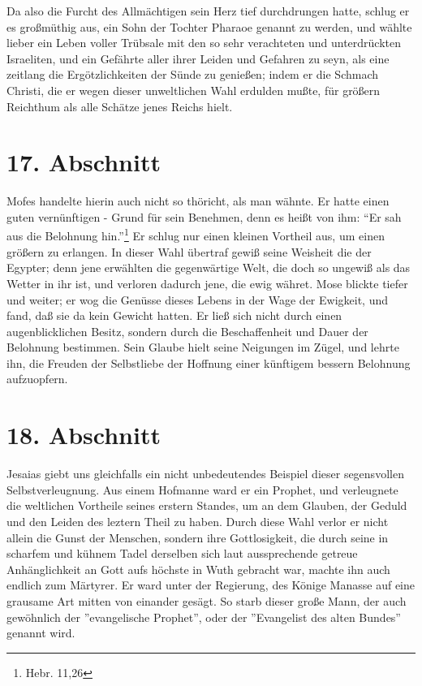 Da also die Furcht des Allmächtigen sein Herz tief durchdrungen hatte, schlug er
es großmüthig aus, ein Sohn der Tochter Pharaoe genannt zu werden, und wählte
lieber ein Leben voller Trübsale mit den so sehr verachteten und unterdrückten
Israeliten, und ein Gefährte aller ihrer Leiden und Gefahren zu seyn, als eine
zeitlang die Ergötzlichkeiten der Sünde zu genießen; indem er die Schmach
Christi, die er wegen dieser unweltlichen Wahl erdulden mußte, für größern
Reichthum als alle Schätze jenes Reichs hielt.

\section{17. Abschnitt} \label{kap4_ab17}

Mofes handelte hierin auch nicht so thöricht, als man wähnte. Er hatte einen
guten vernünftigen - Grund für sein Benehmen, denn es heißt von ihm: "`Er sah
aus die Belohnung hin."'\footnote{Hebr. 11,26} Er schlug nur einen kleinen
Vortheil aus, um einen größern zu erlangen. In dieser Wahl übertraf gewiß seine
Weisheit die der Egypter; denn jene erwählten die gegenwärtige Welt, die doch so
ungewiß als das Wetter in ihr ist, und verloren dadurch jene, die ewig währet.
Mose blickte tiefer und weiter; er wog die Genüsse dieses Lebens in der Wage der
Ewigkeit, und fand, daß sie da kein Gewicht hatten. Er ließ sich nicht durch
einen augenblicklichen Besitz, sondern durch die Beschaffenheit und Dauer der
Belohnung bestimmen. Sein Glaube hielt seine Neigungen im Zügel, und lehrte ihn,
die Freuden der Selbstliebe der Hoffnung einer künftigem bessern Belohnung
aufzuopfern.

\section{18. Abschnitt} \label{kap4_ab18}

Jesaias giebt uns gleichfalls ein nicht unbedeutendes Beispiel dieser
segensvollen Selbstverleugnung. Aus einem Hofmanne ward er ein Prophet, und
verleugnete die weltlichen Vortheile seines erstern Standes, um an dem Glauben,
der Geduld und den Leiden des leztern Theil zu haben. Durch diese Wahl verlor er
nicht allein die Gunst der Menschen, sondern ihre Gottlosigkeit, die durch seine
in scharfem und kühnem Tadel derselben sich laut aussprechende getreue
Anhänglichkeit an Gott aufs höchste in Wuth gebracht war, machte ihn auch
endlich zum Märtyrer. Er ward unter der Regierung, des Könige Manasse auf eine
grausame Art mitten von einander gesägt. So starb dieser große Mann, der auch
gewöhnlich der ''evangelische Prophet'', oder der ''Evangelist des alten
Bundes'' genannt wird.

